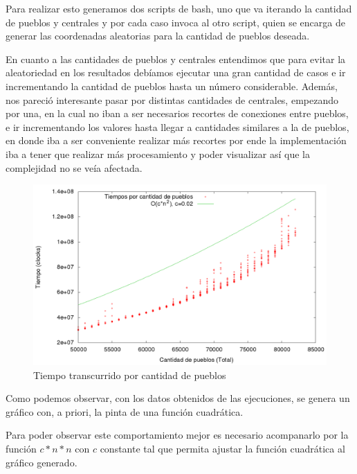 Para realizar esto generamos dos scripts de bash, uno que va iterando la cantidad de pueblos y centrales y por cada caso invoca al otro script, quien se encarga de generar las coordenadas aleatorias para la cantidad de pueblos deseada.

En cuanto a las cantidades de pueblos y centrales entendimos que para evitar la aleatoriedad en los resultados deb\'iamos ejecutar una gran cantidad de casos e ir incrementando la cantidad de pueblos hasta un n\'umero considerable. 
Adem\'as, nos pareci\'o interesante pasar por distintas cantidades de centrales, empezando por una, en la cual no iban a ser necesarios recortes de conexiones entre pueblos, e ir incrementando los valores hasta llegar a cantidades similares a la de pueblos, en donde iba a ser conveniente realizar m\'as recortes por ende la implementaci\'on iba a tener que realizar m\'as procesamiento y poder visualizar as\'i que la complejidad no se ve\'ia afectada.

\begin{center}
\begin{figure}[h!]
\includegraphics[scale=0.4]{./img/ej2_chart.png}
\caption{Tiempo transcurrido por cantidad de pueblos}
\end{figure}
\end{center}





Como podemos observar, con los datos obtenidos de las ejecuciones, se genera un gr\'afico con, a priori, la pinta de una funci\'on cuadr\'atica. 

Para poder observar este comportamiento mejor es necesario acompanarlo por la funci\'on $c*n*n$ con $c$ constante tal que permita ajustar la funci\'on cuadr\'atica al gr\'afico generado.

